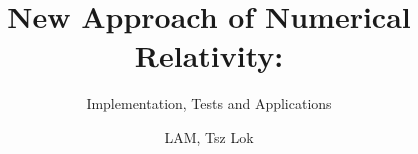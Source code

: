 \title{New Approach of Numerical Relativity:}

\subtitle{Implementation, Tests and Applications}

\author{LAM, Tsz Lok}









     



\renewcommand{\submissiontext}{A Thesis Submitted in Partial Fulfilment \\ of the Reqirements for the Degree of}

